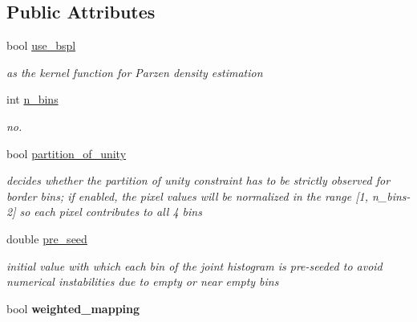 \subsection*{Public Attributes}
\begin{DoxyCompactItemize}
\item 
\hypertarget{structRSCVParams_a7fd215b0863b471bae4f95b58259af12}{bool \hyperlink{structRSCVParams_a7fd215b0863b471bae4f95b58259af12}{use\-\_\-bspl}}\label{structRSCVParams_a7fd215b0863b471bae4f95b58259af12}

\begin{DoxyCompactList}\small\item\em as the kernel function for Parzen density estimation \end{DoxyCompactList}\item 
int \hyperlink{structRSCVParams_a8aaca4a91a8b7227e611d1706a8a7448}{n\-\_\-bins}
\begin{DoxyCompactList}\small\item\em no. \end{DoxyCompactList}\item 
\hypertarget{structRSCVParams_afbc370f7d29d3b53283b63d51fcd5766}{bool \hyperlink{structRSCVParams_afbc370f7d29d3b53283b63d51fcd5766}{partition\-\_\-of\-\_\-unity}}\label{structRSCVParams_afbc370f7d29d3b53283b63d51fcd5766}

\begin{DoxyCompactList}\small\item\em decides whether the partition of unity constraint has to be strictly observed for border bins; if enabled, the pixel values will be normalized in the range \mbox{[}1, n\-\_\-bins-\/2\mbox{]} so each pixel contributes to all 4 bins \end{DoxyCompactList}\item 
\hypertarget{structRSCVParams_ae9ff84fdb9737edc3e0a9d3e22496096}{double \hyperlink{structRSCVParams_ae9ff84fdb9737edc3e0a9d3e22496096}{pre\-\_\-seed}}\label{structRSCVParams_ae9ff84fdb9737edc3e0a9d3e22496096}

\begin{DoxyCompactList}\small\item\em initial value with which each bin of the joint histogram is pre-\/seeded to avoid numerical instabilities due to empty or near empty bins \end{DoxyCompactList}\item 
\hypertarget{structRSCVParams_ab26ec6cba039c87782a7d10aabf3efcb}{bool {\bfseries weighted\-\_\-mapping}}\label{structRSCVParams_ab26ec6cba039c87782a7d10aabf3efcb}


\end{DoxyCompactItemize}
